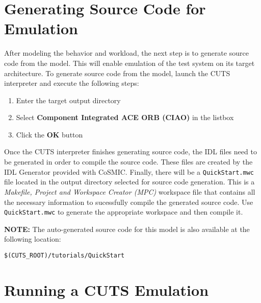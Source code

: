 \section{Generating Source Code for Emulation}
\label{sec:tutorial-generation}

After modeling the behavior and workload, the next step is to generate 
source code from the model. This will enable emulation of the test 
system on its target architecture. To generate source code from the 
model, launch the CUTS interpreter and execute the following steps:
\begin{enumerate}
  \item Enter the target output directory
  
  \item Select \textbf{Component Integrated ACE ORB (CIAO)} in the listbox
  
  \item Click the \textbf{OK} button
\end{enumerate}

Once the CUTS interpreter finishes generating source code, the IDL 
files need to be generated in order to compile the source code. 
These files are created by the IDL Generator provided with CoSMIC. 
Finally, there will be a \texttt{QuickStart.mwc} file located in the output 
directory selected for source code generation. This is a
\textit{Makefile, Project and Workspace Creator (MPC)} workspace file 
that contains 
all the necessary information to sucessfully compile the generated 
source code. Use \texttt{QuickStart.mwc} to generate the appropriate 
workspace and then compile it.

\textbf{NOTE:} The auto-generated source code for this model is 
also available at the following location: 
\begin{lstlisting}
$(CUTS_ROOT)/tutorials/QuickStart
\end{lstlisting}

\section{Running a CUTS Emulation}
\label{sec:tutorial-execution}

